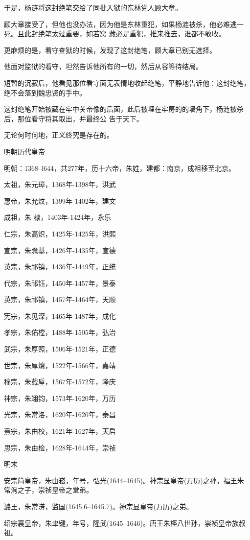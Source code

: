 \documentclass[11pt,a4paper,onecolumn]{article}
\begin{document}
于是，杨涟将这封绝笔交给了同批入狱的东林党人顾大章。

顾大章接受了，但他也没办法，因为他是东林重犯，如果杨涟被杀，他必难逃一死。且此封绝笔太过重要，如若窝
藏必是重犯，推来推去，谁都不敢收。

更麻烦的是，看守查狱的时候，发现了这封绝笔，顾大章已别无选择。

他面对监狱的看守，坦然告诉他所有的一切，然后从容等待结局。

短暂的沉寂后，他看见那位看守面无表情地收起绝笔，平静地告诉他：这封绝笔，绝不会落到魏忠贤的手中。

这封绝笔开始被藏在牢中关帝像的后面，此后被埋在牢房的的墙角下，杨涟被杀后，那位看守将其取出，并最终公
告于天下。

无论何时何地，正义终究是存在的。

明朝历代皇帝

明朝：1368--l644，共277年，历十六帝，朱姓，建都：南京，成祖移至北京。

太祖，朱元璋，1368年-1398年，洪武

惠帝，朱允炆，1399年-1402年，建文

成祖，朱 棣，1403年-1424年，永乐

仁宗，朱高炽，1425年-1425年，洪熙

宣宗，朱瞻基，1426年-1435年，宣德

英宗，朱祁镇，1436年-1449年，正统

代宗，朱祁钰，1450年-1457年，景泰

英宗，朱祁镇，1457年-1464年，天顺

宪宗，朱见深，1465年-1487年，成化

孝宗，朱佑樘，1488年-1505年，弘治

武宗，朱厚照，1506年-1521年，正德

世宗，朱厚熜，1522年-1566年，嘉靖

穆宗，朱载垕，1567年-1572年，隆庆

神宗，朱翊钧，1573年-1620年，万历

光宗，朱常洛，1620年-1620年，泰昌

熹宗，朱由校，1621年-1627年，天启

思宗，朱由检，1628年-1644年，崇祯

明末

安宗简皇帝，朱由崧，年号，弘光(1644--1645)。神宗显皇帝(万历)之孙，福王朱常洵之子，崇祯皇帝之堂弟。

潞王，朱常淓，监国(1645.6--1645.7)。神宗显皇帝(万历)之弟。

绍宗襄皇帝，朱聿键，年号，隆武(1645--1646)。唐王朱桱八世孙，崇祯皇帝族叔祖。
\end{document}
